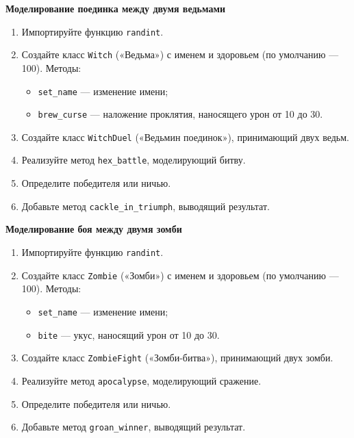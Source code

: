 \item \textbf{Моделирование поединка между двумя ведьмами}

\begin{enumerate}
    \item Импортируйте функцию \texttt{randint}.

    \item Создайте класс \texttt{Witch} («Ведьма») с именем и здоровьем (по умолчанию — 100).  
    Методы:
    \begin{itemize}
        \item \texttt{set\_name} — изменение имени;
        \item \texttt{brew\_curse} — наложение проклятия, наносящего урон от 10 до 30.
    \end{itemize}

    \item Создайте класс \texttt{WitchDuel} («Ведьмин поединок»), принимающий двух ведьм.

    \item Реализуйте метод \texttt{hex\_battle}, моделирующий битву.

    \item Определите победителя или ничью.

    \item Добавьте метод \texttt{cackle\_in\_triumph}, выводящий результат.
\end{enumerate}

\item \textbf{Моделирование боя между двумя зомби}

\begin{enumerate}
    \item Импортируйте функцию \texttt{randint}.

    \item Создайте класс \texttt{Zombie} («Зомби») с именем и здоровьем (по умолчанию — 100).  
    Методы:
    \begin{itemize}
        \item \texttt{set\_name} — изменение имени;
        \item \texttt{bite} — укус, наносящий урон от 10 до 30.
    \end{itemize}

    \item Создайте класс \texttt{ZombieFight} («Зомби-битва»), принимающий двух зомби.

    \item Реализуйте метод \texttt{apocalypse}, моделирующий сражение.

    \item Определите победителя или ничью.

    \item Добавьте метод \texttt{groan\_winner}, выводящий результат.
\end{enumerate}


